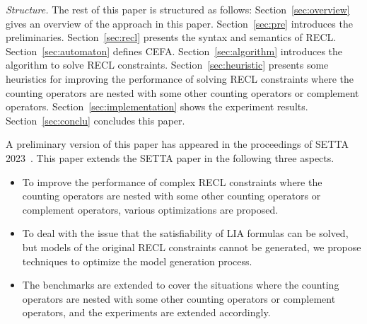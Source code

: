 
\smallskip
\noindent
\emph{Structure.} 
The rest of this paper is structured as follows: Section~\ref{sec:overview} gives an overview of the approach in this paper. Section~\ref{sec:pre} introduces the preliminaries. 
Section~\ref{sec:recl} presents the syntax and semantics of RECL. 
Section~\ref{sec:automaton} defines CEFA. Section~\ref{sec:algorithm} introduces the algorithm to solve RECL constraints. 
Section~\ref{sec:heuristic} presents some heuristics for improving the performance of solving RECL constraints where the counting operators are nested with some other counting operators or complement operators. Section~\ref{sec:implementation} shows the experiment results. Section~\ref{sec:conclu} concludes this paper.

\smallskip

A preliminary version of this paper has appeared in the proceedings of SETTA 2023~\cite{Denghang2023}. This paper extends the SETTA paper in the following three aspects.
\begin{itemize}
\item To improve the performance of complex RECL constraints where the counting operators are nested with some other counting operators or complement operators, various optimizations are proposed. 
\item To deal with the issue that the satisfiability of LIA formulas can be solved, but models of the original RECL constraints cannot be generated, we propose techniques to optimize the model generation process.  
\item The benchmarks are extended to cover the situations where the counting operators are nested with some other counting operators or complement operators, and the experiments are extended accordingly.  
\end{itemize}